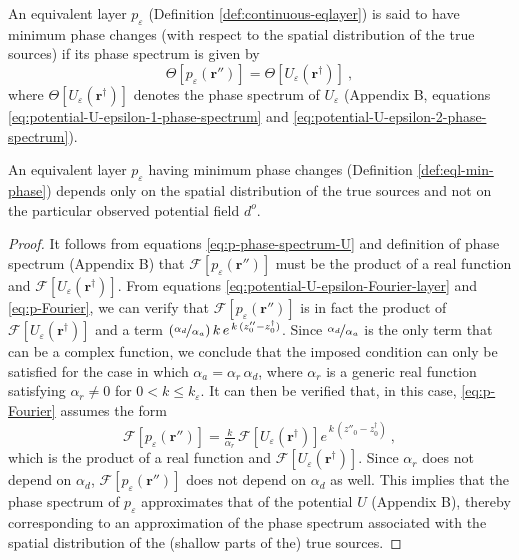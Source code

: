 \begin{definition}
	An equivalent layer $p_{\varepsilon}$ (Definition \ref{def:continuous-eqlayer}) is said to have minimum 
	phase changes (with respect to the spatial distribution of the true sources) if its phase spectrum is given by
	\begin{equation}
		\Theta [ p_{\varepsilon}(\mathbf{r}'') ] = \Theta [ U_{\varepsilon}(\mathbf{r}^{\dagger}) ] \: ,
		\label{eq:p-phase-spectrum-U}
	\end{equation}
	where $\Theta [ U_{\varepsilon}(\mathbf{r}^{\dagger}) ]$ denotes the phase spectrum of $U_{\varepsilon}$ 
	(Appendix B, equations \ref{eq:potential-U-epsilon-1-phase-spectrum} and \ref{eq:potential-U-epsilon-2-phase-spectrum}).
	\label{def:eql-min-phase}
\end{definition}
\begin{proposition}
	\label{prop:minimum-phase-change-layers}
	An equivalent layer $p_{\varepsilon}$ having minimum phase changes (Definition \ref{def:eql-min-phase})
	depends only on the spatial distribution of the true sources and not on the particular observed 
	potential field $d^{o}$.
\end{proposition}
\begin{proof}
	It follows from equations \ref{eq:p-phase-spectrum-U} and definition of phase spectrum (Appendix B) that 
	$\mathcal{F} [ p_{\varepsilon}(\mathbf{r}'') ]$ must be the product of a real function and
	$\mathcal{F} [ U_{\varepsilon}(\mathbf{r}^{\dagger}) ]$.
	From equations \ref{eq:potential-U-epsilon-Fourier-layer} and \ref{eq:p-Fourier}, we can verify that 
	$\mathcal{F} [ p_{\varepsilon}(\mathbf{r}'') ]$ is in fact the product of 
	$\mathcal{F} [ U_{\varepsilon}(\mathbf{r}^{\dagger}) ]$ 
	and a term $\left( \nicefrac{\alpha_{d}}{\alpha_{a}} \right) k \, e^{\, k \, (z''_{0} - z^{\dagger}_{0})}$. 
	Since $\nicefrac{\alpha_{d}}{\alpha_{a}}$ is the only term that can be a complex function, we conclude that 
	the imposed condition can only be satisfied for the case in which $\alpha_{a} = \alpha_{r} \, \alpha_{d}$, 
	where $\alpha_{r}$ is a generic real function satisfying $\alpha_{r} \ne 0$ for $0 < k \le k_{\varepsilon}$.
	It can then be verified that, in this case, \ref{eq:p-Fourier} assumes the form
	\begin{equation}
		\mathcal{F} [ p_{\varepsilon}(\mathbf{r}'') ] =
		\tfrac{k}{\alpha_{r}} \, \mathcal{F} [ U_{\varepsilon}(\mathbf{r}^{\dagger}) ] 
		e^{\, k \, (z''_{0} - z^{\dagger}_{0})} \: ,
		\label{eq:p-Fourier-min-phase}
	\end{equation}
	which is the product of a real function and $\mathcal{F} [ U_{\varepsilon}(\mathbf{r}^{\dagger}) ]$.
	Since $\alpha_{r}$ does not depend on $\alpha_{d}$, $\mathcal{F} [ p_{\varepsilon}(\mathbf{r}'') ]$ does not 
	depend on $\alpha_{d}$ as well. This implies that the phase spectrum of $p_{\varepsilon}$ approximates that 
	of the potential $U$ (Appendix B), thereby corresponding to an approximation 
	of the phase spectrum associated with the spatial distribution of the (shallow parts of the) true sources.
\end{proof}

